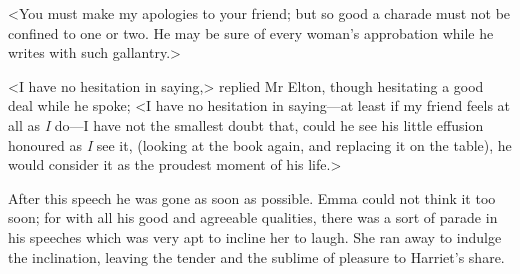 <You must make my apologies to your friend; but so good a charade must not be confined to one or two. He may be sure of every woman's approbation while he writes with such gallantry.>

<I have no hesitation in saying,> replied Mr Elton, though hesitating a good deal while he spoke; <I have no hesitation in saying—at least if my friend feels at all as \textit{I} do—I have not the smallest doubt that, could he see his little effusion honoured as \textit{I} see it, (looking at the book again, and replacing it on the table), he would consider it as the proudest moment of his life.>

After this speech he was gone as soon as possible. Emma could not think it too soon; for with all his good and agreeable qualities, there was a sort of parade in his speeches which was very apt to incline her to laugh. She ran away to indulge the inclination, leaving the tender and the sublime of pleasure to Harriet's share.